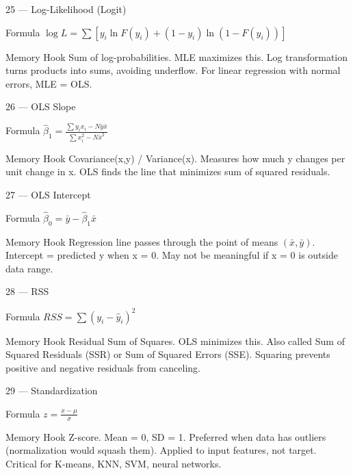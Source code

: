 \documentclass[aspectratio=169,8pt]{beamer}
\begin{document}
	\begin{frame}{25 --- Log-Likelihood (Logit)}
		\begin{block}{Formula}
			$\log L = \sum[y_i \ln F(y_i) + (1-y_i)\ln(1-F(y_i))]$
		\end{block}
		\begin{block}{Memory Hook}
			Sum of log-probabilities. MLE maximizes this. Log transformation turns products into sums, avoiding underflow. For linear regression with normal errors, MLE = OLS.
		\end{block}
	\end{frame}
	
	\begin{frame}{26 --- OLS Slope}
		\begin{block}{Formula}
			$\hat{\beta}_1 = \frac{\sum y_i x_i - N\bar{y}\bar{x}}{\sum x_i^2 - N\bar{x}^2}$
		\end{block}
		\begin{block}{Memory Hook}
			Covariance(x,y) / Variance(x). Measures how much y changes per unit change in x. OLS finds the line that minimizes sum of squared residuals.
		\end{block}
	\end{frame}
	
	\begin{frame}{27 --- OLS Intercept}
		\begin{block}{Formula}
			$\hat{\beta}_0 = \bar{y} - \hat{\beta}_1\bar{x}$
		\end{block}
		\begin{block}{Memory Hook}
			Regression line passes through the point of means $(\bar{x}, \bar{y})$. Intercept = predicted y when x = 0. May not be meaningful if x = 0 is outside data range.
		\end{block}
	\end{frame}
	
	\begin{frame}{28 --- RSS}
		\begin{block}{Formula}
			$RSS = \sum(y_i - \hat{y}_i)^2$
		\end{block}
		\begin{block}{Memory Hook}
			Residual Sum of Squares. OLS minimizes this. Also called Sum of Squared Residuals (SSR) or Sum of Squared Errors (SSE). Squaring prevents positive and negative residuals from canceling.
		\end{block}
	\end{frame}
	
	\begin{frame}{29 --- Standardization}
		\begin{block}{Formula}
			$z = \frac{x - \mu}{\sigma}$
		\end{block}
		\begin{block}{Memory Hook}
			Z-score. Mean = 0, SD = 1. Preferred when data has outliers (normalization would squash them). Applied to input features, not target. Critical for K-means, KNN, SVM, neural networks.
		\end{block}
	\end{frame}
	
\end{document}
